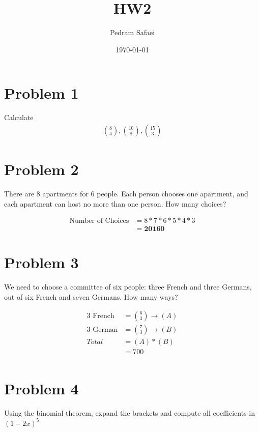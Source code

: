 \documentclass{article}
\title{HW2}
\date{\today}
\author{Pedram Safaei}
\begin{document}
	\maketitle
	\newpage
	
\section*{Problem 1} 
	
	Calculate 	
	\begin{align*} 
	{8 \choose 4}, {10 \choose 8},{15 \choose 3}
	\end{align*}
	
	
\section*{Problem 2} 
There are 8 apartments for 6 people. Each person chooses one apartment, and each apartment can host no more than one person. How many choices?
	
	\begin{align*}
	\text{Number of Choices} &=  8 * 7 * 6 * 5 * 4 * 3 \\
										 &= \mathbf{ 20160}
	\end{align*}
	
\section*{Problem 3} 
	We need to choose a committee of six people: three French and three Germans, out of six French and seven Germans. How many ways?
	
	\begin{align*}
	\text{3 French} &= {6 \choose 3}  \rightarrow (A) \\
	\text{3 German} &= {7 \choose 3} \rightarrow (B) \\
	Total &= (A) * (B) \\
			&= 700 \\
	\end{align*}
	
\section*{Problem 4} 
Using the binomial theorem, expand the brackets and compute all coefficients in 
$(1 - 2x)^5$ 
	
\end{document}
